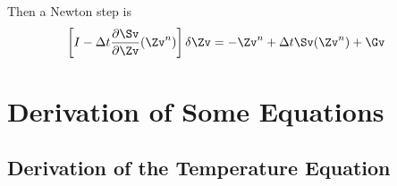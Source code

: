 \documentclass{article}
\begin{document}
Then a Newton step is
\begin{align*}
  \left[I - \dt {\partial \Sv \over\partial \Zv}(\Zv^n)\right] \delta\Zv & = -\Zv^n + \dt \Sv(\Zv^n) + \Gv
\end{align*}


\section{Derivation of Some Equations}

\subsection{Derivation of the Temperature Equation}\label{sec:temperature}
\end{document}
